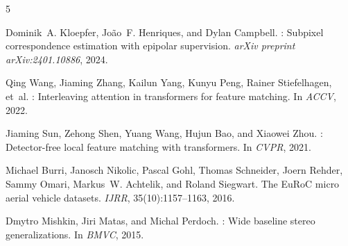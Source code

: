 \documentclass[11pt,a4paper]{article}
\begin{document}

\begin{thebibliography}{5}

Dominik~A. Kloepfer, Jo\~{a}o~F. Henriques, and Dylan Campbell.
: Subpixel correspondence estimation with epipolar supervision.
\newblock \emph{arXiv preprint arXiv:2401.10886}, 2024.

Qing Wang, Jiaming Zhang, Kailun Yang, Kunyu Peng, Rainer Stiefelhagen, et~al.
: Interleaving attention in transformers for feature matching.
\newblock In \emph{ACCV}, 2022.

Jiaming Sun, Zehong Shen, Yuang Wang, Hujun Bao, and Xiaowei Zhou.
: Detector-free local feature matching with transformers.
\newblock In \emph{CVPR}, 2021.

Michael Burri, Janosch Nikolic, Pascal Gohl, Thomas Schneider, Joern Rehder, Sammy Omari, Markus~W. Achtelik, and Roland Siegwart.
\newblock The {EuRoC} micro aerial vehicle datasets.
\newblock \emph{IJRR}, 35(10):1157--1163, 2016.

Dmytro Mishkin, Jiri Matas, and Michal Perdoch.
: Wide baseline stereo generalizations.
\newblock In \emph{BMVC}, 2015.

\end{thebibliography}
\end{document}
